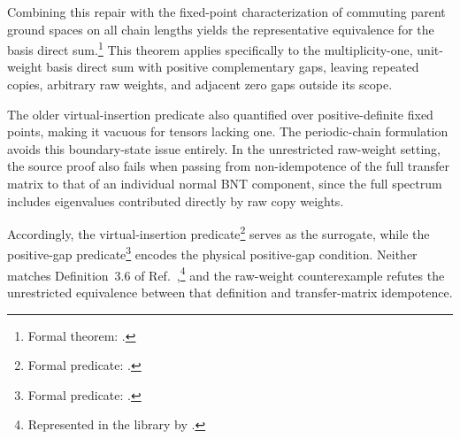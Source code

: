 \documentclass{article}
\begin{document}
Combining this repair with the fixed-point characterization of commuting parent
ground spaces on all chain lengths yields the representative equivalence for
the basis direct sum.\footnote{Formal theorem:
.}
This theorem applies specifically to the multiplicity-one, unit-weight basis
direct sum with positive complementary gaps, leaving repeated copies, arbitrary
raw weights, and adjacent zero gaps outside its scope.

The older virtual-insertion predicate also quantified over positive-definite
fixed points, making it vacuous for tensors lacking one. The periodic-chain
formulation avoids this boundary-state issue entirely. In the unrestricted
raw-weight setting, the source proof also fails when passing from
non-idempotence of the full transfer matrix to that of an individual normal BNT
component, since the full spectrum includes eigenvalues contributed directly by
raw copy weights.

Accordingly, the virtual-insertion predicate\footnote{Formal predicate:
.} serves as the surrogate, while the positive-gap
predicate\footnote{Formal predicate: .}
encodes the physical positive-gap condition. Neither matches
Definition~3.6 of Ref.~\cite{Cirac2016MPDO_arXiv},\footnote{Represented
in the library by .} and the raw-weight
counterexample refutes the unrestricted equivalence between that definition and
transfer-matrix idempotence.



\end{document}
